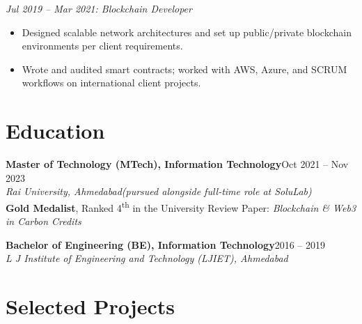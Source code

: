 \documentclass[11pt, a4paper]{article}
\begin{document}
\vspace{4pt}
\textit{\small Jul 2019 – Mar 2021: Blockchain Developer}

\begin{itemize}
  \item Designed scalable network architectures and set up public/private blockchain environments per client requirements.
  \item Wrote and audited smart contracts; worked with AWS, Azure, and SCRUM workflows on international client projects.
\end{itemize}

\section{Education}

\noindent
\textbf{Master of Technology (MTech), Information Technology}\hfill\textcolor{mutedcolor}{\small Oct 2021 – Nov 2023}\\
\textit{\textcolor{accentcolor}{Rai University, Ahmedabad}}\hfill\textcolor{mutedcolor}{\small\textit{(pursued alongside full-time role at SoluLab)}}\\
\textbf{Gold Medalist}, Ranked 4\textsuperscript{th} in the University\quad\textbullet\quad
Review Paper: \textit{Blockchain \& Web3 in Carbon Credits}

\vspace{5pt}
\noindent
\textbf{Bachelor of Engineering (BE), Information Technology}\hfill\textcolor{mutedcolor}{\small 2016 – 2019}\\
\textit{\textcolor{accentcolor}{L J Institute of Engineering and Technology (LJIET), Ahmedabad}}

\section{Selected Projects}
\end{document}
